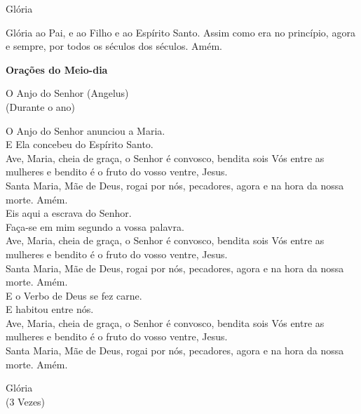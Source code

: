 \documentclass{book}
\begin{document}
\begin{center}
    Glória
\end{center}
\begin{flushleft}
    Glória ao Pai, e ao Filho e ao Espírito Santo. Assim como era no princípio, agora e sempre, por todos os séculos dos séculos. Amém.
\end{flushleft}
\newpage
\begin{center}
    \textbf{Orações do Meio-dia}
\end{center}
\begin{center}
    O Anjo do Senhor (Angelus) \\ \textcolor{VioletRed2}{\scriptsize{(Durante o ano)}}
\end{center}
\begin{flushleft}
    \VbarRed{} O Anjo do Senhor anunciou a Maria. \\
    \RbarRed{} E Ela concebeu do Espírito Santo. \\
    \VbarRed{} Ave, Maria, cheia de graça, o Senhor é convosco, bendita sois Vós entre as mulheres e bendito é o fruto do vosso ventre, Jesus. \\
    \RbarRed{} Santa Maria, Mãe de Deus, rogai por nós, pecadores, agora e na hora da nossa morte. Amém.
    \vspace{.2cm} \\
    \VbarRed{} Eis aqui a escrava do Senhor. \\
    \RbarRed{} Faça-se em mim segundo a vossa palavra. \\
    \VbarRed{} Ave, Maria, cheia de graça, o Senhor é convosco, bendita sois Vós entre as mulheres e bendito é o fruto do vosso ventre, Jesus. \\
    \RbarRed{} Santa Maria, Mãe de Deus, rogai por nós, pecadores, agora e na hora da nossa morte. Amém.
    \vspace{.2cm} \\
    \VbarRed{} E o Verbo de Deus se fez carne. \\
    \RbarRed{} E habitou entre nós. \\
    \VbarRed{} Ave, Maria, cheia de graça, o Senhor é convosco, bendita sois Vós entre as mulheres e bendito é o fruto do vosso ventre, Jesus. \\
    \RbarRed{} Santa Maria, Mãe de Deus, rogai por nós, pecadores, agora e na hora da nossa morte. Amém.
\end{flushleft}
\begin{center}
    Glória \\ \textcolor{VioletRed2}{\scriptsize{(3 Vezes)}}
\end{center}
\end{document}
